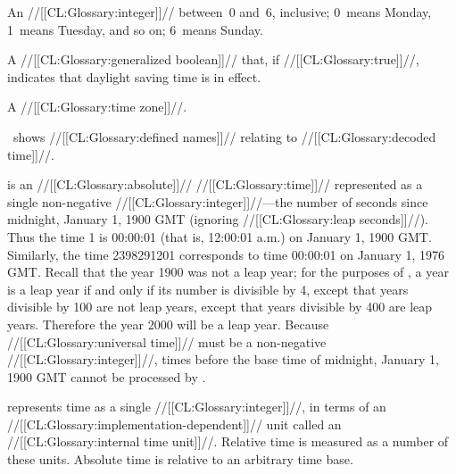 
An //[[CL:Glossary:integer]]// between~0 and~6, inclusive; 0~means Monday, 1~means Tuesday, and so on; 6~means Sunday.
                      


A //[[CL:Glossary:generalized boolean]]// that, if //[[CL:Glossary:true]]//, indicates that daylight saving time is in effect.
 


A //[[CL:Glossary:time zone]]//.

\endlist

\Thenextfigure\ shows //[[CL:Glossary:defined names]]// relating to //[[CL:Glossary:decoded time]]//.


\endsubsubsection%

 

 is an //[[CL:Glossary:absolute]]// //[[CL:Glossary:time]]// represented as a single non-negative //[[CL:Glossary:integer]]//---the number of seconds since midnight, January 1, 1900 GMT (ignoring //[[CL:Glossary:leap seconds]]//). Thus the time 1 is 00:00:01 (that is, 12:00:01 a.m.) on January 1, 1900 GMT. Similarly, the time 2398291201 corresponds to time 00:00:01 on January 1, 1976 GMT. Recall that the year 1900 was not a leap year; for the purposes of \clisp, a year is a leap year if and only if its number is divisible by 4, except that years divisible by 100 are not leap years, except that years divisible by 400 are leap years.  Therefore the year 2000 will be a leap year. Because //[[CL:Glossary:universal time]]// must be a non-negative //[[CL:Glossary:integer]]//, times before the base time of midnight, January 1, 1900 GMT cannot be processed by \clisp.


\endsubsubsection%

 

 represents time as a single //[[CL:Glossary:integer]]//, in terms of an //[[CL:Glossary:implementation-dependent]]// unit called an //[[CL:Glossary:internal time unit]]//. Relative time is measured as a number of these units. Absolute time is relative to an arbitrary time base.


